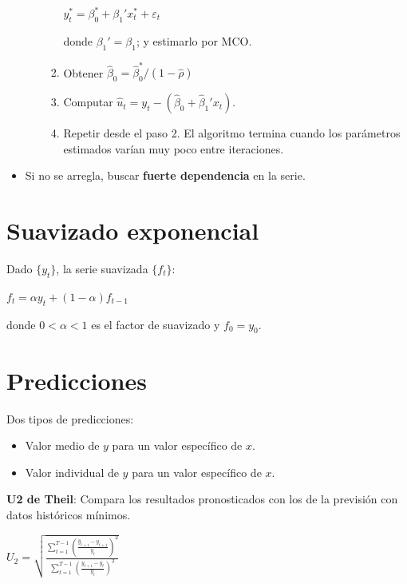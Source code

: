 \documentclass[10pt, a4paper, landscape]{article}
\begin{document}
\begin{multicols}{3}
\begin{itemize}[leftmargin=*]
\begin{itemize}[leftmargin=*]
\begin{enumerate}[leftmargin=*]
\begin{center}
				\( y_{t}^{*} = \beta_{0}^{*} + \beta_{1}' x_{t}^{*} + \varepsilon_{t} \)
			\end{center}
			donde \( \beta_{1}' = \beta_{1} \); y estimarlo por MCO.
			\item Obtener \( \hat{\beta}_0 = \hat{\beta}_{0}^{*} / (1 - \hat{\rho}) \)
			\item Computar \( \hat{u}_{t} = y_{t} - (\hat{\beta}_{0} + \hat{\beta}_{1}' x_{t}) \).
			\item Repetir desde el paso 2. El algoritmo termina cuando los parámetros estimados varían muy poco entre iteraciones.
		\end{enumerate}
	\end{itemize}
	\item Si no se arregla, buscar \textbf{fuerte dependencia} en la serie.
\end{itemize}

\section*{Suavizado exponencial}

Dado \( \{ y_{t} \} \), la serie suavizada \( \{ f_{t} \} \):

\begin{center}
	\( f_{t} = \alpha y_{t} + (1 - \alpha) f_{t - 1} \)
\end{center}

donde \( 0 < \alpha < 1 \) es el factor de suavizado y \( f_{0} = y_{0} \).

\section*{Predicciones}

Dos tipos de predicciones:

\begin{itemize}[leftmargin=*]
	\item Valor medio de \( y \) para un valor específico de \( x \).
	\item Valor individual de \( y \) para un valor específico de \( x \).
\end{itemize}

\textbf{U2 de Theil}: Compara los resultados pronosticados con los de la previsión con datos históricos mínimos.

\begin{center}
	\( U_{2} = \sqrt{\frac{\sum_{t = 1}^{T - 1} \left( \frac{\hat{y}_{t + 1} - y_{t + 1}}{y_{t}} \right)^{2}}{\sum_{t = 1}^{T - 1} \left( \frac{y_{t + 1} - y_{t}}{y_{t}} \right)^{2}}} \)
\end{center}


\end{multicols}
\end{document}
